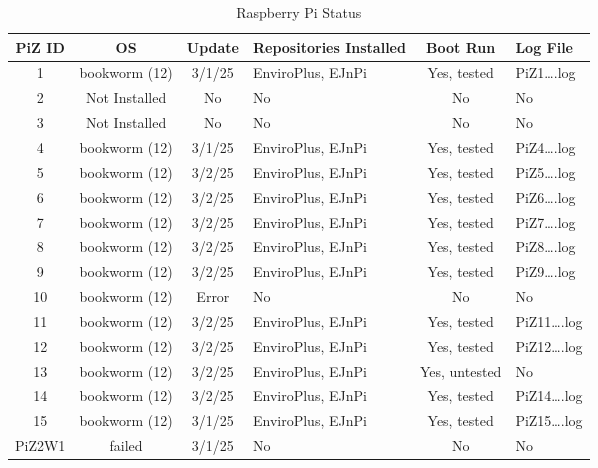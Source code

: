 \documentclass{article}
\begin{document}
\begin{table}[h!]
\begin{center}
\begin{tabular}{|c|c|c|p{2.3cm}|c| l|}
\hline
\textbf{PiZ ID} & \textbf{OS} & \textbf{Update} & \textbf{Repositories Installed} & \textbf{Boot Run} & \textbf{Log File} \\
\hline
1  & bookworm (12)    & 3/1/25 & EnviroPlus, EJnPi & Yes, tested  & PiZ1\ldots.log\\
2  & Not Installed    & No & No  & No & No\\
3  & Not Installed    & No & No & No & No\\
4  & bookworm (12)    & 3/1/25 & EnviroPlus, EJnPi & Yes, tested & PiZ4\ldots.log \\

5  & bookworm (12)    & 3/2/25 & EnviroPlus, EJnPi & Yes, tested & PiZ5\ldots.log \\
6  & bookworm (12)    & 3/2/25 & EnviroPlus, EJnPi & Yes, tested & PiZ6\ldots.log \\
7  & bookworm (12)    & 3/2/25 & EnviroPlus, EJnPi & Yes, tested & PiZ7\ldots.log \\
8  & bookworm (12)    & 3/2/25 & EnviroPlus, EJnPi & Yes, tested & PiZ8\ldots.log \\

9  & bookworm (12)    & 3/2/25 & EnviroPlus, EJnPi & Yes, tested& PiZ9\ldots.log\\
10 & bookworm (12)    & Error & No & No & No \\
11 & bookworm (12)    & 3/2/25 & EnviroPlus, EJnPi & Yes, tested & PiZ11\ldots.log \\
12 & bookworm (12)    & 3/2/25 & EnviroPlus, EJnPi & Yes, tested & PiZ12\ldots.log \\

13 & bookworm (12)    & 3/2/25 & EnviroPlus, EJnPi & Yes, untested & No \\
14 & bookworm (12)    & 3/2/25 & EnviroPlus, EJnPi & Yes, tested & PiZ14\ldots.log  \\
15 & bookworm (12)    & 3/1/25 & EnviroPlus, EJnPi & Yes, tested & PiZ15\ldots.log \\
PiZ2W1 & failed       & 3/1/25  & No & No & No \\


\hline
\end{tabular}
\end{center}
\caption{Raspberry Pi Status}
\label{table:1}
\end{table}
\end{document}
